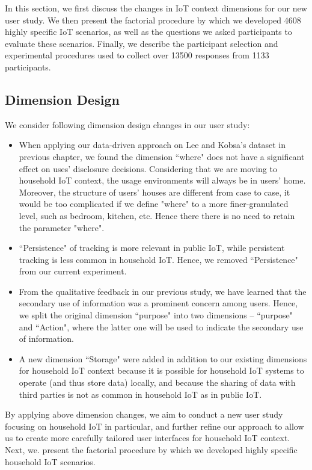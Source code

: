 In this section, we first discuss the changes in IoT context dimensions for our new user study. We then present the factorial procedure by which we developed 4608 highly specific IoT scenarios, as well as the questions we asked participants to evaluate these scenarios. Finally, we describe the participant selection and experimental procedures used to collect over 13500 responses from 1133 participants.

\subsection{Dimension Design}
We consider following dimension design changes in our user study:
\begin{itemize}
    \item When applying our data-driven approach on Lee and Kobsa's dataset in previous chapter, we found the dimension ``where" does not have a significant effect on uses' disclosure decisions. Considering that we are moving to household IoT context, the usage environments will always be in users' home. Moreover, the structure of users' houses are different from case to case, it would be too complicated if we define "where" to a more finer-granulated level, such as bedroom, kitchen, etc.  Hence there there is no need to retain the parameter "where". 
    \item ``Persistence" of tracking is more relevant in public IoT, while persistent tracking is less common in household IoT. Hence, we removed ``Persistence" from our current experiment.
    \item From the qualitative feedback in our previous study, we have learned that the secondary use of information was a prominent concern among users. Hence, we split the original dimension ``purpose" into two dimensions -- ``purpose" and ``Action", where the latter one will be used to indicate the secondary use of information.
    \item A new dimension ``Storage" were added in addition to our existing dimensions for household IoT context because it is possible for household IoT systems to operate (and thus store data) locally, and because the sharing of data with third parties is not as common in household IoT as in public IoT.
\end{itemize}

By applying above dimension changes, we aim to conduct a new user study focusing on household IoT in particular, and further refine our approach to allow us to create more carefully tailored user interfaces for household IoT context. Next, we. present the factorial procedure by which we developed highly specific household IoT scenarios.

